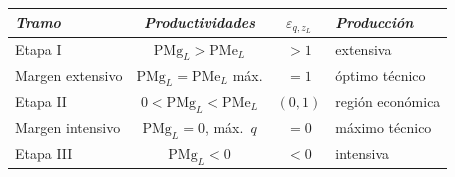 \documentclass{article}
\begin{document}
\begin{columnas}
\begin{itemize}
\end{itemize}
{\centering\small\renewcommand{\arraystretch}{1.15}\setlength{\tabcolsep}{3pt}%
\begin{tabular}{@{}lccl@{}}
\toprule
\textit{Tramo} & \textit{Productividades} & $\varepsilon_{q,z_L}$ & \textit{Producción}\\
\midrule
\textcolor{tceedorado}{Etapa I} & $\mathrm{PMg}_L>\mathrm{PMe}_L$ & $>1$ & extensiva\\
Margen extensivo & $\mathrm{PMg}_L=\mathrm{PMe}_L$ máx. & $=1$ & óptimo técnico\\
\textcolor{tceeverde}{Etapa II} & $0<\mathrm{PMg}_L<\mathrm{PMe}_L$ & $(0,1)$ & región económica\\
Margen intensivo & $\mathrm{PMg}_L=0$, máx.\ $q$ & $=0$ & máximo técnico\\
\textcolor{tceerojo}{Etapa III} & $\mathrm{PMg}_L<0$ & $<0$ & intensiva\\
\bottomrule
\end{tabular}\par}


\end{columnas}
\end{document}
